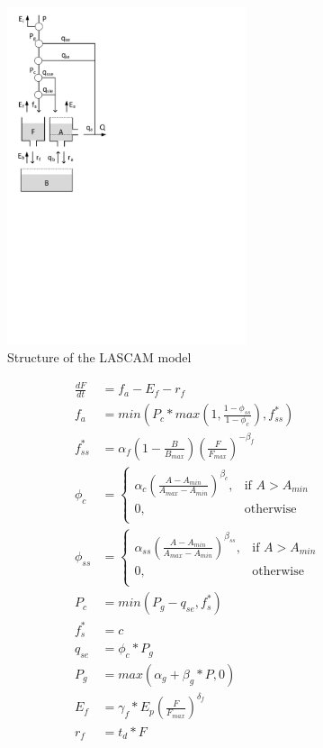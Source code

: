 { 																	%
\begin{figure}
\includegraphics[trim=1cm 13.5cm 7cm 1cm,width=7cm,keepaspectratio]{./AppA_files/23_schematic.pdf}
\caption{Structure of the LASCAM model} \label{fig:23_schematic}
\end{figure}

\begin{align}
	\frac{dF}{dt} &= f_a-E_f-r_f \\
	f_a &= min\left(P_c*max\left(1,\frac{1-\phi_{ss}}{1-\phi_c}\right),f_{ss}^*\right) \\
	f_{ss}^* &= \alpha_f\left(1-\frac{B}{B_{max}}\right)\left(\frac{F}{F_{max}}\right)^{-\beta_f}\\
	\phi_c &= \begin{cases}
		\alpha_c\left(\frac{A-A_{min}}{A_{max}-A_{min}}\right)^{\beta_c}, &\text{if } A > A_{min} \\
		0, & \text{otherwise} \\
	\end{cases}\\
	\phi_{ss} &= \begin{cases}
		\alpha_{ss}\left(\frac{A-A_{min}}{A_{max}-A_{min}}\right)^{\beta_{ss}}, &\text{if } A > A_{min} \\
		0, & \text{otherwise} \\
	\end{cases}\\
	P_c &= min\left(P_g-q_{se},f^*_s\right) \\
	f^*_s &= c \\
	q_{se} &= \phi_c*P_g \\
	P_g &= max\left(\alpha_g+\beta_g*P,0\right)\\
	E_f &= \gamma_f*E_p\left(\frac{F}{F_{max}}\right)^{\delta_f}\\
	r_f &= t_d*F
\end{align}

} %

